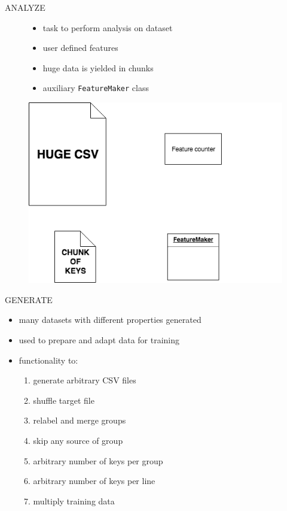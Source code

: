 \documentclass{beamer}
\begin{document}
\begin{darkframes}
    \begin{frame}{ANALYZE}
      \begin{figure}[H]
        \centering
        \begin{minipage}{.5\textwidth}
          \begin{itemize}
            \item task to perform analysis on dataset
            \item user defined features
            \item huge data is yielded in chunks
            \item auxiliary \texttt{FeatureMaker} class
          \end{itemize}          
        \end{minipage}%
        \begin{minipage}{.5\textwidth}
          \centering
          \includegraphics[width=0.98\linewidth]{../tex/images/analyze_task_img}
        \end{minipage}
      \end{figure}  
    \end{frame}

    \begin{frame}{GENERATE}
      \begin{itemize}
        \item many datasets with different properties generated
        \item used to prepare and adapt data for training
        \item functionality to:
        \begin{enumerate}
          \item generate arbitrary CSV files
          \item shuffle target file
          \item relabel and merge groups
          \item skip any source of group
          \item arbitrary number of keys per group
          \item arbitrary number of keys per line
          \item multiply training data
        \end{enumerate}
      \end{itemize}
    \end{frame}


\end{darkframes}
\end{document}
